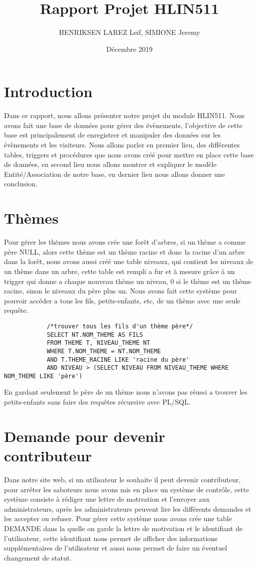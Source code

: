 \documentclass[french]{article}
\title{Rapport Projet HLIN511}
\author{HENRIKSEN LAREZ Leif, SIMIONE Jeremy}
\date{Décembre 2019}
\begin{document}
    \begin{titlepage}
        \clearpage\maketitle
        \thispagestyle{empty}
    \end{titlepage}
    \newpage
        \tableofcontents
    \newpage
        \section{Introduction}
            Dans ce rapport, nous allons présenter notre projet du module HLIN511. Nous avons fait une base de données pour gérer des évènements, l'objective de cette base est principalement de enregistrer et manipuler des données sur les évènements et les visiteurs. Nous allons parler en premier lieu, des différentes tables, triggers et procédures que nous avons créé pour mettre en place cette base de données, en second lieu nous allons montrer et expliquer le modèle Entité/Association de notre base, en dernier lieu nous allons donner une conclusion.
    \newpage
    \section{Thèmes}
        Pour gérer les thèmes nous avons crée une forêt d'arbres, si un thème a comme père NULL, alors cette thème est un thème racine et donc la racine d'un arbre dans la forêt, nous avons aussi créé une table niveaux, qui contient les niveaux de un thème dans un arbre, cette table est rempli a fur et à mesure grâce à un trigger qui donne a chaque nouveau thème un niveau, 0 si le thème est un thème racine, sinon le niveaux du père plus un. Nous avons fait cette système pour pouvoir accéder a tous les fils, petits-enfants, etc, de un thème avec une seule requête. 
        \begin{verbatim}
            /*trouver tous les fils d'un thème père*/
            SELECT NT.NOM_THEME AS FILS
            FROM THEME T, NIVEAU_THEME NT
            WHERE T.NOM_THEME = NT.NOM_THEME
            AND T.THEME_RACINE LIKE 'racine du père'
            AND NIVEAU > (SELECT NIVEAU FROM NIVEAU_THEME WHERE NOM_THEME LIKE 'père')
        \end{verbatim}
        En gardant seulement le père de un thème nous n'avons pas réussi a trouver les petits-enfants sans faire des requêtes récursive avec PL/SQL. 
    \section{Demande pour devenir contributeur}
        Dans notre site web, si un utilisateur le souhaite il peut devenir contributeur, pour arrêter les saboteurs nous avons mis en place un système de contrôle, cette système consiste à rédiger une lettre de motivation et l'envoyer aux administrateurs, après les administrateurs peuvent lire les différents demandes et les accepter ou refuser. Pour gérer cette système nous avons crée une table DEMANDE dans la quelle on garde la lettre de motivation et le identifiant de l'utilisateur, cette identifiant nous permet de afficher des informations supplémentaires de l'utilisateur et aussi nous permet de faire un éventuel changement de statut.
\end{document}
